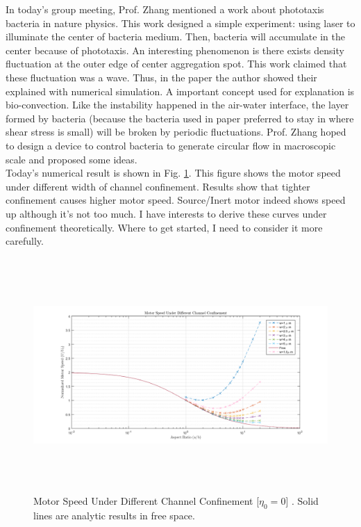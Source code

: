 \documentclass[fontsize=11pt, %
                             paper=a4, %
                             twoside, %
                             captions=tableheading,
                             index=totoc,
                             hyperref]{labbook}
\begin{document}
\begin{addmargin}[4cm]{0cm}
In today's group meeting, Prof. Zhang mentioned a work about phototaxis bacteria in nature physics. This work designed a simple experiment: using laser to illuminate the center of bacteria medium. Then, bacteria will accumulate in the center because of phototaxis. An interesting phenomenon is there exists density fluctuation at the outer edge of center aggregation spot. This work claimed that these fluctuation was a wave. Thus, in the paper the author showed their explained with numerical simulation. A important concept used for explanation is bio-convection. Like the instability happened in the air-water interface, the layer formed by bacteria (because the bacteria used in paper preferred to stay in where shear stress is small) will be broken by periodic fluctuations. Prof. Zhang hoped to design a device to control bacteria to generate circular flow in macroscopic scale and proposed some ideas. \\
Today's numerical result is shown in Fig. \ref{2016-11-24-MSUDCC}. This figure shows the motor speed under different width of channel confinement. Results show that tighter confinement causes higher motor speed. Source/Inert motor indeed shows speed up although it's not too much. I have interests to derive these curves under confinement theoretically. Where to get started, I need to consider it more carefully.
\begin{figure}
\centering
\includegraphics[width=\linewidth, height=3.5in]{2016-11-24-MotorSpeed_DiffChannel.png}
\caption{Motor Speed Under Different Channel Confinement [$\eta_0=0$] . Solid lines are analytic results in free space.}\label{2016-11-24-MSUDCC}
\end{figure}


\end{addmargin}
\end{document}
